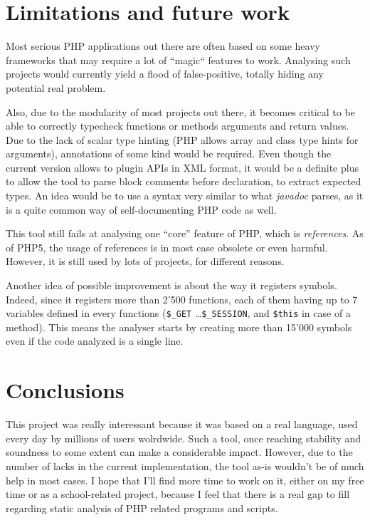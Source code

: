\documentclass[a4paper]{article}
\begin{document}
\section{Limitations and future work}
Most serious PHP applications out there are often based on some heavy frameworks
that may require a lot of ``magic`` features to work. Analysing such projects
would currently yield a flood of false-positive, totally hiding any potential
real problem.

Also, due to the modularity of most projects out there, it becomes critical to
be able to correctly typecheck functions or methods arguments and return values.
Due to the lack of scalar type hinting (PHP allows array and class type hints
for arguments), annotations of some kind would be required. Even though the
current version allows to plugin APIs in XML format, it would be a definite
plus to allow the tool to parse block comments before declaration, to extract
expected types. An idea would be to use a syntax very similar to what
\emph{javadoc} parses, as it is a quite common way of self-documenting PHP
code as well.

This tool still fails at analysing one ``core'' feature of PHP, which is
\emph{references}. As of PHP5, the usage of references is in most case obsolete
or even harmful. However, it is still used by lots of projects, for different
reasons.

Another idea of possible improvement is about the way it registers symbols.
Indeed, since it registers more than 2'500 functions, each of them having up to
7 variables defined in every functions (\verb/$_GET/ \ldots \verb/$_SESSION/,
and \verb/$this/ in case of a method). This means the analyser starts by
creating more than 15'000 symbols even if the code analyzed is a single line.

\section{Conclusions}
This project was really interessant because it was based on a real language, used
every day by millions of users wolrdwide. Such a tool, once reaching stability
and soundness to some extent can make a considerable impact. However, due to the
number of lacks in the current implementation, the tool as-is wouldn't be of
much help in most cases. I hope that I'll find more time to work on it, either
on my free time or as a school-related project, because I feel that there is a
real gap to fill regarding static analysis of PHP related programs and scripts.
\end{document}
